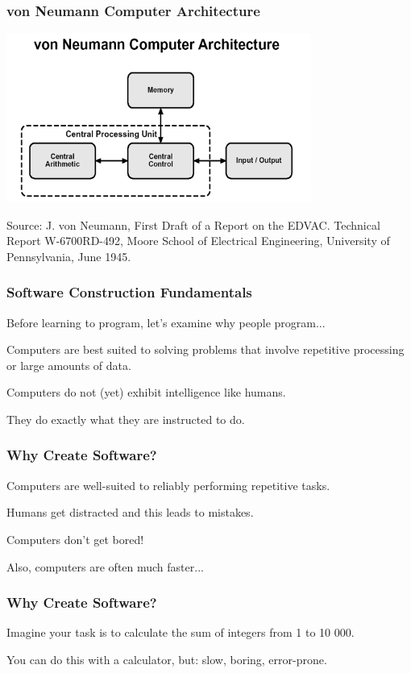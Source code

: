 \begin{frame}
\frametitle{von Neumann Computer Architecture}

\begin{center}
\includegraphics[width=0.75\textwidth]{images/vonNeumann.png}
\end{center}

\tiny{Source: J. von Neumann, First Draft of a Report on the EDVAC.  Technical Report W-6700RD-492, Moore School of Electrical Engineering, University of Pennsylvania, June 1945.}

\end{frame}

\begin{frame}
\frametitle{Software Construction Fundamentals}
Before learning to program, let's examine why people program...

Computers are best suited to solving problems that involve repetitive processing or large amounts of data.

Computers do not (yet) exhibit intelligence like humans.

They do exactly what they are instructed to do.

\end{frame}


\begin{frame}
\frametitle{Why Create Software?}
Computers are well-suited to reliably performing repetitive tasks.

Humans get distracted and this leads to mistakes.

Computers don't get bored!

Also, computers are often much faster...

\end{frame}

\begin{frame}
\frametitle{Why Create Software?}

Imagine your task is to calculate the sum of integers from 1 to 10 000.

You can do this with a calculator, but: slow, boring, error-prone.

\end{frame}

